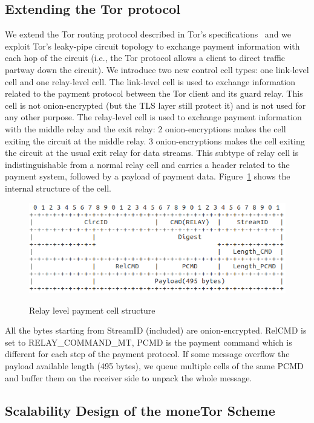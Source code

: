 
\subsection{Extending the Tor protocol}
We extend the Tor routing protocol described in Tor's specifications~\cite{torspec} and we exploit Tor's leaky-pipe circuit topology to exchange payment information with each hop of the circuit (i.e., the Tor protocol allows a client to direct traffic partway down the circuit). We introduce two new control cell types: one link-level cell and one relay-level cell. The link-level cell is used to exchange information related to the payment protocol between the Tor client and its guard relay. This cell is not onion-encrypted (but the TLS layer still protect it) and is not used for any other purpose. The relay-level cell is used to exchange payment information with the middle relay and the exit relay: 2 onion-encryptions makes the cell exiting the circuit at the middle relay. 3 onion-encryptions makes the cell exiting the circuit at the usual exit relay for data streams. This subtype of relay cell is indistinguishable from a normal relay cell and carries a header related to the payment system, followed by a payload of payment data. Figure~\ref{fig:relay_command_mt_structure} shows the internal structure of the cell.

\begin{figure}[h]
	\centering
	\includegraphics[scale=0.38]{images/payment_cell_header.png}
	\label{fig:relay_command_mt_structure}
	\caption{Relay level payment cell structure}
\end{figure}

All the bytes starting from StreamID (included) are onion-encrypted. RelCMD is set to RELAY\_COMMAND\_MT, PCMD is the payment command which is different for each step of the payment protocol. If some message overflow the payload available length (495 bytes), we queue multiple cells of the same PCMD and buffer them on the receiver side to unpack the whole message.


\subsection{Scalability Design of the moneTor Scheme}
\label{subsub:scalability}

